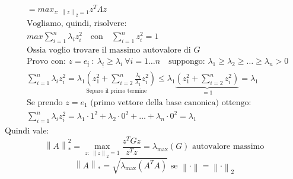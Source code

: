 \documentclass{article}
\begin{document}
\begin{align*}
     & =max_{z:\ \left\|z\right\|_2=1}z^T\Lambda z                                                                                                                                                                                      \\
     & \text{Vogliamo, quindi, risolvere: }                                                                                                                                                                                             \\
     & max\sum_{i=1}^n \lambda_i z^2_i\quad\text{con}\quad\sum_{i=1}^n z_i^2=1                                                                                                                                                          \\
     & \text{Ossia voglio trovare il massimo autovalore di }G                                                                                                                                                                           \\
     & \text{Provo con: }z=e_{\underline{i}}\ :\ \lambda_{\underline{i}}\ge\lambda_i\ \forall i=1\dots n\quad\text{suppongo: }\lambda_1\ge\lambda_2\ge\dots\ge\lambda_n>0                                                               \\
     & \sum_{i=1}^{n}\lambda_iz^2_i=\underset{\text{Separo il primo termine}}{\lambda_1\left(z_1^2+\sum_{i=2}^{n}\frac{\lambda_i}{\lambda_1}z^2_i\right)}\le\lambda_1\underbrace{\left(z_1^2+\sum_{i=2}^{n}z^2_i\right)}_{=1}=\lambda_1 \\
     & \text{Se prendo }z=e_1\text{ (primo vettore della base canonica) ottengo:}                                                                                                                                                       \\
     & \sum_{i=1}^{n}\lambda_iz^2_i=\lambda_1\cdot1^2+\lambda_2\cdot0^2+\dots+\lambda_n\cdot0^2=\boxed{\lambda_1}
\end{align*}
Quindi vale:$$\left\|A\right\|_*^2=\max_{z:\ \left\|z\right\|_2=1}\frac{z^TGz}{z^Tz}=\lambda_{\mathrm{max}}(G)\text{ autovalore massimo}$$
$$\boxed{\left\|A\right\|_*=\sqrt{\lambda_{\mathrm{max}}\left(A^TA\right)}\text{ se }\left\|\cdot\right\|=\left\|\cdot\right\|_2}$$
\end{document}

